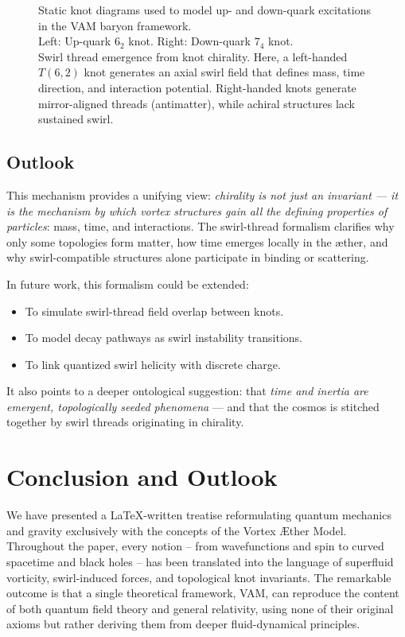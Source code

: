 \documentclass[a4paper,12pt]{article}
\begin{document}
\begin{figure}[H]
\begin{minipage}{0.25\textwidth}
        \end{minipage}
        \caption{Static knot diagrams used to model up- and down-quark excitations in the VAM baryon framework.\\
        Left: Up-quark \(6_2\) knot. Right: Down-quark \(7_4\) knot.\\
        Swirl thread emergence from knot chirality. Here, a left-handed $T(6,2)$ knot generates an axial swirl field that defines mass, time direction, and interaction potential. Right-handed knots generate mirror-aligned threads (antimatter), while achiral structures lack sustained swirl.}
        \label{fig:chiralsummary}
    \end{figure}



    \subsection*{Outlook}

    This mechanism provides a unifying view: \textit{chirality is not just an invariant — it is the mechanism by which vortex structures gain all the defining properties of particles}: mass, time, and interactions. The swirl-thread formalism clarifies why only some topologies form matter, how time emerges locally in the æther, and why swirl-compatible structures alone participate in binding or scattering.

    In future work, this formalism could be extended:
    \begin{itemize}
        \item To simulate swirl-thread field overlap between knots.
        \item To model decay pathways as swirl instability transitions.
        \item To link quantized swirl helicity with discrete charge.
    \end{itemize}

    It also points to a deeper ontological suggestion: that \textit{time and inertia are emergent, topologically seeded phenomena} — and that the cosmos is stitched together by swirl threads originating in chirality.


\section{Conclusion and Outlook}
    We have presented a LaTeX-written treatise reformulating quantum mechanics and gravity exclusively with the concepts of the Vortex Æther Model. Throughout the paper, every notion – from wavefunctions and spin to curved spacetime and black holes – has been translated into the language of superfluid vorticity, swirl-induced forces, and topological knot invariants. The remarkable outcome is that a single theoretical framework, VAM, can reproduce the content of both quantum field theory and general relativity, using none of their original axioms but rather deriving them from deeper fluid-dynamical principles.
\end{document}

